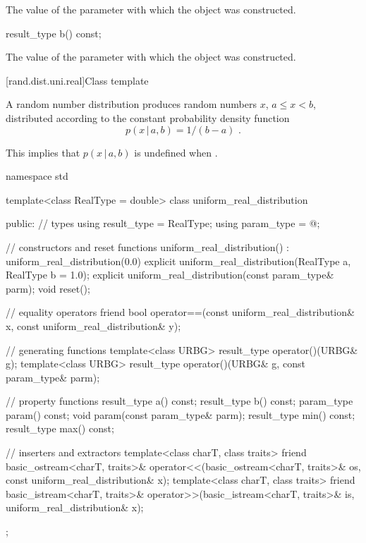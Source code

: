 \begin{itemdescr}
\pnum
\returns
The value of the  parameter
 with which the object was constructed.
\end{itemdescr}

%
\begin{itemdecl}
result_type b() const;
\end{itemdecl}

\begin{itemdescr}
\pnum
\returns
The value of the  parameter
 with which the object was constructed.
\end{itemdescr}


[rand.dist.uni.real]{Class template }%
%

\pnum
A  random number distribution
produces random numbers $x$,
$a \leq x < b$,
distributed according to
the constant probability density function%
\[ p(x\,|\,a,b) = 1 / (b - a) \text{ .} \]
\begin{note}
This implies that $p(x\,|\,a,b)$ is undefined when .
\end{note}

%
%
\begin{codeblock}
namespace std {
  template<class RealType = double>
  class uniform_real_distribution {
  public:
    // types
    using result_type = RealType;
    using param_type  = @\unspec@;

    // constructors and reset functions
    uniform_real_distribution() : uniform_real_distribution(0.0) {}
    explicit uniform_real_distribution(RealType a, RealType b = 1.0);
    explicit uniform_real_distribution(const param_type& parm);
    void reset();

    // equality operators
    friend bool operator==(const uniform_real_distribution& x,
                           const uniform_real_distribution& y);

    // generating functions
    template<class URBG>
      result_type operator()(URBG& g);
    template<class URBG>
      result_type operator()(URBG& g, const param_type& parm);

    // property functions
    result_type a() const;
    result_type b() const;
    param_type param() const;
    void param(const param_type& parm);
    result_type min() const;
    result_type max() const;

    // inserters and extractors
    template<class charT, class traits>
      friend basic_ostream<charT, traits>&
        operator<<(basic_ostream<charT, traits>& os, const uniform_real_distribution& x);
    template<class charT, class traits>
      friend basic_istream<charT, traits>&
        operator>>(basic_istream<charT, traits>& is, uniform_real_distribution& x);
  };
}
\end{codeblock}


